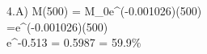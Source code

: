 4.A) \hspace{0.2cm}
M(500) = M_0e^{(-0.001026)(500)} \\
=e^{(-0.001026)(500)} \\
e^{-0.513} = 0.5987 = 59.9\%

